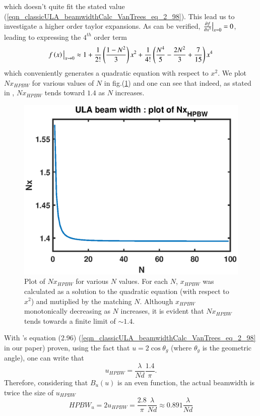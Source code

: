 which doesn't quite fit the stated value (\ref{eqn_classicULA_beamwidthCalc_VanTrees_eq_2_98}). This lead us to investigate a higher order taylor expansions. As can be verified, $\evalat{\frac{\partial{f}}{\partial{x}^{3}}}{x=0} = 0$, leading to expressing the $4^{th}$ order term
\begin{equation}
    \evalat{f\left(x\right)}{x\to0}
    \approx
    1 
    + 
    \frac{1}{2!}\left(\frac{1-N^{2}}{3}\right)x^{2}
    +
    \frac{1}{4!}\left(\frac{N^{4}}{5}-\frac{2N^{2}}{3}+\frac{7}{15}\right)x^{4}
\end{equation}
which conveniently generates a quadratic equation with respect to $x^{2}$. We plot $Nx_{HPBW}$ for various values of $N$ in fig.(\ref{fig_classicULA_beamwidth_Nx_HPBW}) and one can see that indeed, as stated in \cite{VanTrees2002DetectionIV}, $Nx_{HPBW}$ tends toward $1.4$ as $N$ increases.
\begin{figure}
    \label{fig_classicULA_beamwidth_Nx_HPBW}
    \centering
    \includegraphics[width=0.6\linewidth]{./Media/spatial_IIR_MATLAB/beamwidth/Nx_HPBW.eps}
    \caption{Plot of $Nx_{HPBW}$ for various $N$ values. For each $N$, $x_{HPBW}$ was calculated as a solution to the quadratic equation (with respect to $x^{2}$) and mutiplied by the matching $N$. Although $x_{HPBW}$ monotonically decreasing as $N$ increases, it is evident that $Nx_{HPBW}$ tends towards a finite limit of $\sim1.4$.}
\end{figure}
With \cite{VanTrees2002DetectionIV}'s equation (2.96) (\ref{eqn_classicULA_beamwidthCalc_VanTrees_eq_2_98} in our paper) proven, using the fact that $u = 2\cos{\theta_{g}}$ (where $\theta_{g}$ is the geometric angle), one can write that
$$
u_{HPBW} = \frac{\lambda}{Nd}\frac{1.4}{\pi}.
$$
Therefore, considering that $B_{u}\left(u\right)$ is an even function, the actual beamwidth is twice the size of $u_{HPBW}$ 
\begin{equation}
    HPBW_{u} = 2u_{HPBW} = \frac{2.8}{\pi}\frac{\lambda}{Nd} \approx 0.891\frac{\lambda}{Nd}
\end{equation}
